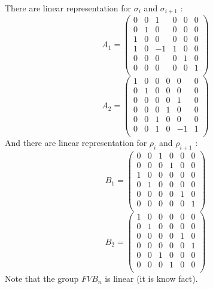 \documentclass{article}
\begin{document}
There are linear representation for $\sigma_i$ and $\sigma_{i+1}$ :
\begin{equation*}
A_1 = 
\begin{pmatrix}
  0& 0& 1& 0& 0& 0 \\
  0& 1& 0& 0& 0& 0 \\
  1& 0& 0& 0& 0& 0 \\
  1& 0& -1&1& 0& 0 \\
  0& 0& 0& 0& 1& 0 \\
  0& 0& 0& 0& 0& 1\\
\end{pmatrix}
\end{equation*}
\begin{equation*}
A_2 = 
\begin{pmatrix}
  1& 0& 0& 0& 0& 0 \\
  0& 1& 0& 0& 0& 0\\
  0& 0& 0& 0& 1& 0\\
  0& 0& 0& 1& 0& 0\\
  0& 0& 1& 0& 0& 0\\
  0& 0& 1& 0& -1& 1 \\
\end{pmatrix}
\end{equation*}
And there are linear representation for $\rho_i$ and $\rho_{i+1}$ :
\begin{equation*}
B_1 = 
\begin{pmatrix}
   0& 0& 1& 0& 0& 0\\
  0& 0& 0& 1& 0& 0\\
  1& 0& 0& 0& 0& 0\\
  0& 1& 0& 0& 0& 0\\
  0& 0& 0& 0& 1& 0\\
  0& 0& 0& 0& 0& 1\\
\end{pmatrix}
\end{equation*}
\begin{equation*}
B_2 = 
\begin{pmatrix}
  1& 0& 0& 0& 0& 0\\
  0& 1& 0& 0& 0& 0\\
  0& 0& 0& 0& 1& 0\\
  0& 0& 0& 0& 0& 1\\
  0& 0& 1& 0& 0& 0\\
  0& 0& 0& 1& 0& 0\\
\end{pmatrix}
\end{equation*}
Note that the group $FVB_n$ is linear (it is know fact).
\end{document}

